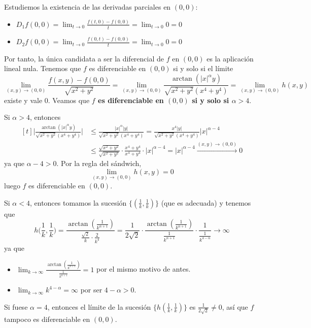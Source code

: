 \documentclass[12pt]{report}
\begin{document}
\vspace{2mm}
Estudiemos la existencia de las derivadas parciales en $(0,0)$:
\begin{itemize}
    \item $\displaystyle D_1f(0,0) = \lim_{t \to 0} \frac{f(t,0)-f(0,0)}{t} = \lim_{t \to 0} 0 = 0$
    \item $\displaystyle D_2f(0,0) = \lim_{t \to 0} \frac{f(0,t)-f(0,0)}{t} = \lim_{t \to 0} 0 = 0$
\end{itemize}
Por tanto, la única candidata a ser la diferencial de $f$ en $(0,0)$ es la aplicación lineal nula. Tenemos que $f$ es diferenciable en $(0,0)$ si y solo si el límite
\[\lim_{(x,y) \to (0,0)}\frac{f(x,y) - f(0,0)}{\sqrt{x^2+y^2}} = \lim_{(x,y) \to (0,0)} \frac{\arctan(|x|^\alpha y)}{\sqrt{x^2+y^2}(x^4+y^4)} = \lim_{(x,y) \to (0,0)} h(x,y)\]
existe y vale $0$. Veamos que \textbf{$f$ es diferenciable en $(0,0)$ si y solo si $\alpha > 4$}.

\vspace{2mm}
Si $\alpha > 4$, entonces
\[
\begin{aligned}[t]
\biggr|\frac{\arctan(|x|^\alpha y)}{\sqrt{x^2+y^2}(x^4 + y^4)}\biggl| &\leq \frac{|x|^\alpha |y|}{\sqrt{x^2+y^2}(x^4+y^4)} = \frac{x^4 |y|}{\sqrt{x^2+y^2}(x^4+y^4)}|x|^{\alpha-4} \\
&\leq \frac{\sqrt{x^2+y^2}}{\sqrt{x^2+y^2}} \cdot \frac{x^4+y^4}{x^4+y^4} \cdot |x|^{\alpha-4} = |x|^{\alpha-4} \xrightarrow{(x,y) \to (0,0)} 0
\end{aligned}
\]
ya que $\alpha-4 > 0$. Por la regla del sándwich,
\[\lim_{(x,y) \to (0,0)}h(x,y) = 0\]
luego $f$ es diferenciable en $(0,0)$.

\vspace{2mm}
Si $\alpha < 4$, entonces tomamos la sucesión $\{(\frac{1}{k},\frac{1}{k})\}$ (que es adecuada) y tenemos que
\[h\biggr(\frac{1}{k},\frac{1}{k} \biggl) = \frac{\arctan(\frac{1}{k^{\alpha+1}})}{\frac{\sqrt{2}}{k} \cdot \frac{2}{k^4}} = \frac{1}{2\sqrt{2}} \cdot \frac{\arctan(\frac{1}{k^{\alpha+1}})}{\frac{1}{k^{\alpha+1}}} \cdot \frac{1}{\frac{1}{k^{4-\alpha}}} \longrightarrow \infty\]
ya que
\begin{itemize}
    \item $\displaystyle \lim_{k \to \infty}\frac{\arctan(\frac{1}{k^{\alpha+1}})}{\frac{1}{k^{\alpha+1}}} = 1$ por el mismo motivo de antes.
    \item $\displaystyle \lim_{k \to \infty} k^{4-\alpha} = \infty$ por ser $4 - \alpha > 0$.
\end{itemize}
Si fuese $\alpha = 4$, entonces el límite de la sucesión $\{h(\frac{1}{k},\frac{1}{k})\}$ es $\frac{1}{2\sqrt{2}} \neq 0$, así que $f$ tampoco es diferenciable en $(0,0)$.
\end{document}
